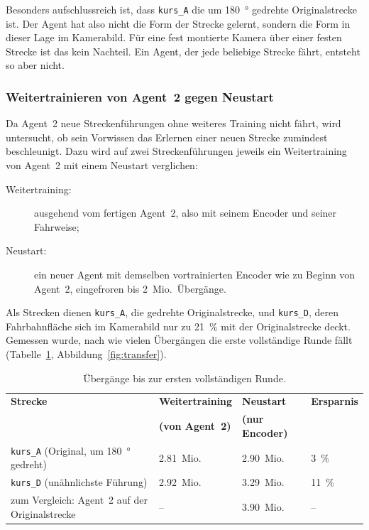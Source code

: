 Besonders aufschlussreich ist, dass \texttt{kurs\_A} die um \SI{180}{\degree} gedrehte Originalstrecke ist. Der Agent hat also nicht die Form der Strecke gelernt, sondern die Form in dieser Lage im Kamerabild. Für eine fest montierte Kamera über einer festen Strecke ist das kein Nachteil. Ein Agent, der jede beliebige Strecke fährt, entsteht so aber nicht.

\subsubsection{Weitertrainieren von Agent~2 gegen Neustart}
\label{subsec:weitertrainieren}

Da Agent~2 neue Streckenführungen ohne weiteres Training nicht fährt, wird untersucht, ob sein Vorwissen das Erlernen einer neuen Strecke zumindest beschleunigt. Dazu wird auf zwei Streckenführungen jeweils ein Weitertraining von Agent~2 mit einem Neustart verglichen:

\begin{description}
  \item[Weitertraining:] ausgehend vom fertigen Agent~2, also mit seinem Encoder und seiner Fahrweise;
  \item[Neustart:] ein neuer Agent mit demselben vortrainierten Encoder wie zu Beginn von Agent~2, eingefroren bis 2~Mio.\ Übergänge.
\end{description}

Als Strecken dienen \texttt{kurs\_A}, die gedrehte Originalstrecke, und \texttt{kurs\_D}, deren Fahrbahnfläche sich im Kamerabild nur zu \SI{21}{\percent} mit der Originalstrecke deckt. Gemessen wurde, nach wie vielen Übergängen die erste vollständige Runde fällt (Tabelle~\ref{tab:transfer}, Abbildung~\ref{fig:transfer}).

\begin{table}[htbp]
  \centering
  \caption{Übergänge bis zur ersten vollständigen Runde.}
  \label{tab:transfer}
  \small
  \begin{tabularx}{\linewidth}{@{}X l l l@{}}
    \toprule
    \textbf{Strecke} & \textbf{Weitertraining} & \textbf{Neustart} & \textbf{Ersparnis} \\
     & \textbf{(von Agent~2)} & \textbf{(nur Encoder)} & \\
    \midrule
    \texttt{kurs\_A} (Original, um \SI{180}{\degree} gedreht) & \num{2.81}~Mio. & \num{2.90}~Mio. & \SI{3}{\percent} \\
    \texttt{kurs\_D} (unähnlichste Führung)                   & \num{2.92}~Mio. & \num{3.29}~Mio. & \SI{11}{\percent} \\
    zum Vergleich: Agent~2 auf der Originalstrecke            & --              & \num{3.90}~Mio. & -- \\
    \bottomrule
  \end{tabularx}
\end{table}

